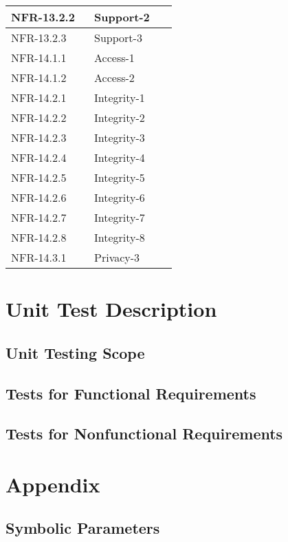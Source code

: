 \documentclass[12pt, titlepage]{article}
\begin{document}
\begin{longtable}{|p{0.45\linewidth}|p{0.45\linewidth}|}
NFR-13.2.2 & Support-2 \\
\hline
NFR-13.2.3 & Support-3 \\
\hline
NFR-14.1.1 & Access-1 \\
\hline
NFR-14.1.2 & Access-2 \\
\hline
NFR-14.2.1 & Integrity-1 \\
\hline
NFR-14.2.2 & Integrity-2 \\
\hline
NFR-14.2.3 & Integrity-3 \\
\hline
NFR-14.2.4 & Integrity-4 \\
\hline
NFR-14.2.5 & Integrity-5 \\
\hline
NFR-14.2.6 & Integrity-6 \\
\hline
NFR-14.2.7 & Integrity-7 \\
\hline
NFR-14.2.8 & Integrity-8 \\
\hline
NFR-14.3.1 & Privacy-3 \\
\hline
\end{longtable}


\section{Unit Test Description}

\subsection{Unit Testing Scope}

\subsection{Tests for Functional Requirements}

\subsection{Tests for Nonfunctional Requirements}





\newpage

\section{Appendix}

\subsection{Symbolic Parameters}
\end{document}
